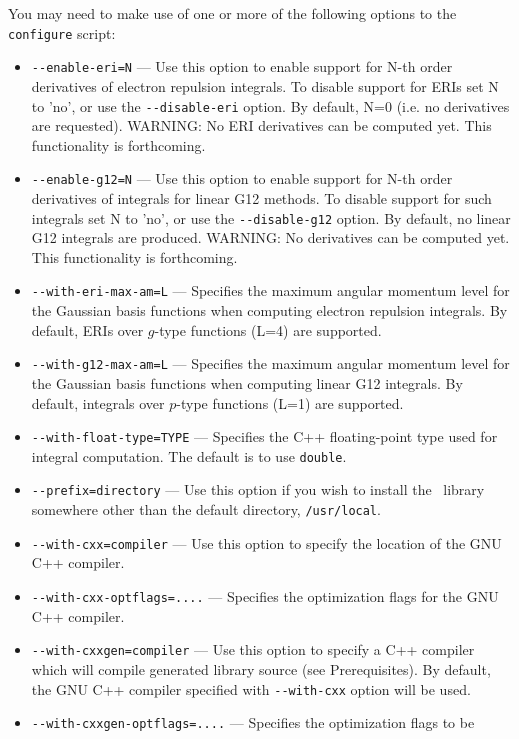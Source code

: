 \documentclass[12pt]{article}
\begin{document}
\noindent
You may need to make use of one or more of the following options to
the {\tt configure} script:
\begin{itemize}
\item {\tt -}{\tt -enable-eri=N} --- Use this option to enable support for
  N-th order derivatives of electron repulsion integrals. To
  disable support for ERIs set N to 'no', or use the {\tt -}{\tt -disable-eri} option.
  By default, N=0 (i.e. no derivatives are requested).
  WARNING: No ERI derivatives can be computed yet. This functionality is forthcoming.
\item {\tt -}{\tt -enable-g12=N} --- Use this option to enable support for
  N-th order derivatives of integrals for linear G12 methods. To
  disable support for such integrals set N to 'no', or use the {\tt -}{\tt -disable-g12} option.
  By default, no linear G12 integrals are produced.
  WARNING: No derivatives can be computed yet. This functionality is forthcoming.
\item {\tt -}{\tt -with-eri-max-am=L} --- Specifies the maximum
  angular momentum level for the Gaussian basis functions
  when computing electron repulsion integrals.  By default,
  ERIs over $g$-type functions (L=4) are supported.
\item {\tt -}{\tt -with-g12-max-am=L} --- Specifies the maximum
  angular momentum level for the Gaussian basis functions
  when computing linear G12 integrals.  By default,
  integrals over $p$-type functions (L=1) are supported.
\item {\tt -}{\tt -with-float-type=TYPE} --- Specifies the C++ floating-point type
  used for integral computation. The default is to use {\tt double}.
\item {\tt -}{\tt -prefix=directory} --- Use this option if you wish to
  install the \LIBINT\ library somewhere other than the default
  directory, {\tt /usr/local}.
\item {\tt -}{\tt -with-cxx=compiler} --- Use this option to specify the location
  of the GNU C++ compiler.
\item {\tt -}{\tt -with-cxx-optflags=....} --- Specifies the optimization flags for
  the GNU C++ compiler.
\item {\tt -}{\tt -with-cxxgen=compiler} --- Use this option to specify a C++ compiler
  which will compile generated library source (see Prerequisites). By default, the GNU C++
  compiler specified with {\tt -}{\tt -with-cxx} option will be used.
\item {\tt -}{\tt -with-cxxgen-optflags=....} --- Specifies the optimization flags to be

\end{itemize}
\end{document}

